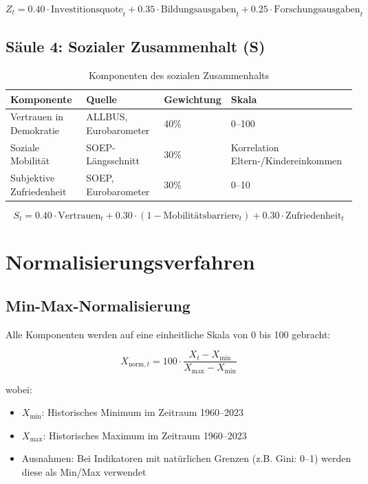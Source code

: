 \[
Z_t = 0.40 \cdot \text{Investitionsquote}_t + 0.35 \cdot \text{Bildungsausgaben}_t + 0.25 \cdot \text{Forschungsausgaben}_t
\]

\subsection{Säule 4: Sozialer Zusammenhalt (S)}

\begin{table}[h]
\centering
\begin{tabular}{llll}
\toprule
\textbf{Komponente} & \textbf{Quelle} & \textbf{Gewichtung} & \textbf{Skala} \\
\midrule
Vertrauen in Demokratie & ALLBUS, Eurobarometer & 40\% & 0--100 \\
Soziale Mobilität & SOEP-Längsschnitt & 30\% & Korrelation Eltern-/Kindereinkommen \\
Subjektive Zufriedenheit & SOEP, Eurobarometer & 30\% & 0--10 \\
\bottomrule
\end{tabular}
\caption{Komponenten des sozialen Zusammenhalts}
\label{tab:komponenten-zusammenhalt}
\end{table}

\[
S_t = 0.40 \cdot \text{Vertrauen}_t + 0.30 \cdot (1 - \text{Mobilitätsbarriere}_t) + 0.30 \cdot \text{Zufriedenheit}_t
\]

\section{Normalisierungsverfahren}

\subsection{Min-Max-Normalisierung}

Alle Komponenten werden auf eine einheitliche Skala von 0 bis 100 gebracht:

\[
X_{\text{norm},t} = 100 \cdot \frac{X_t - X_{\min}}{X_{\max} - X_{\min}}
\]

wobei:
\begin{itemize}
\item $X_{\min}$: Historisches Minimum im Zeitraum 1960--2023
\item $X_{\max}$: Historisches Maximum im Zeitraum 1960--2023
\item Ausnahmen: Bei Indikatoren mit natürlichen Grenzen (z.B. Gini: 0--1) werden diese als Min/Max verwendet
\end{itemize}

